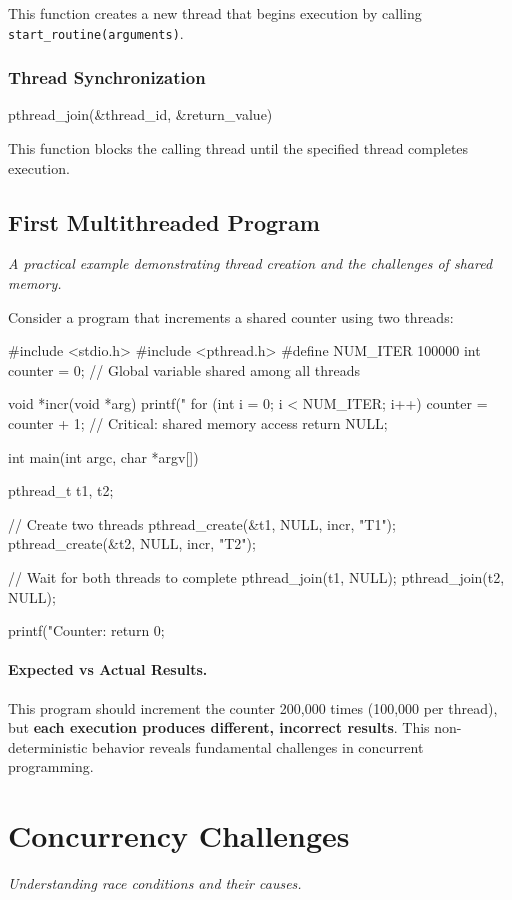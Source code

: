 \documentclass[../../compsys.tex]{subfiles}
\begin{document}
This function creates a new thread that begins execution by calling \texttt{start\_routine(arguments)}.

\subsubsection{Thread Synchronization}
\begin{cc}
pthread_join(&thread_id, &return_value)
\end{cc}

This function blocks the calling thread until the specified thread completes execution.

\subsection{First Multithreaded Program}
\textit{A practical example demonstrating thread creation and the challenges of shared memory.}

Consider a program that increments a shared counter using two threads:

\begin{cc}
#include <stdio.h>
#include <pthread.h>
#define NUM_ITER 100000
int counter = 0;  // Global variable shared among all threads

void *incr(void *arg) {
   printf("%
   for (int i = 0; i < NUM_ITER; i++)
      counter = counter + 1;  // Critical: shared memory access
   return NULL;
}

int main(int argc, char *argv[]) {
   pthread_t t1, t2;
   
   // Create two threads
   pthread_create(&t1, NULL, incr, "T1");
   pthread_create(&t2, NULL, incr, "T2");
   
   // Wait for both threads to complete
   pthread_join(t1, NULL);
   pthread_join(t2, NULL);
   
   printf("Counter: %
   return 0;
}
\end{cc}

\paragraph{Expected vs Actual Results.}
This program should increment the counter 200,000 times (100,000 per thread), but \textbf{each execution produces different, incorrect results}. This non-deterministic behavior reveals fundamental challenges in concurrent programming.

\section{Concurrency Challenges}
\textit{Understanding race conditions and their causes.}
\end{document}

